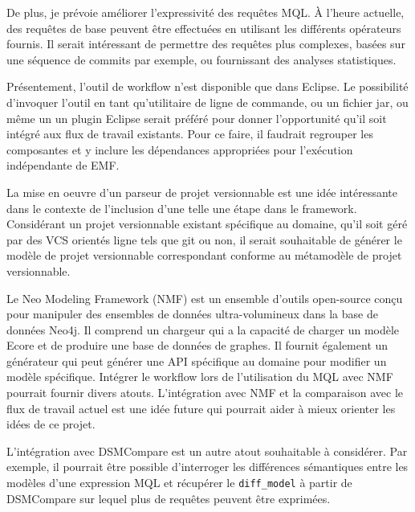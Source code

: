 \documentclass[12pt, titlepage]{article}
\begin{document}
De plus, je prévoie améliorer l'expressivité des requêtes MQL. À l'heure
actuelle, des requêtes de base peuvent être effectuées en utilisant les
différents opérateurs fournis. Il serait intéressant de permettre des requêtes
plus complexes, basées sur une séquence de commits par exemple, ou fournissant
des analyses statistiques.

Présentement, l'outil de workflow n'est disponible que dans Eclipse. Le
possibilité d'invoquer l'outil en tant qu'utilitaire de ligne de commande, ou un
fichier jar, ou même un un plugin Eclipse serait préféré pour donner
l'opportunité qu'il soit intégré aux flux de travail existants. Pour ce faire,
il faudrait regrouper les composantes et y inclure les dépendances appropriées
pour l'exécution indépendante de EMF.

La mise en oeuvre d'un parseur de projet versionnable est une idée intéressante
dans le contexte de l'inclusion d'une telle une étape dans le
framework. Considérant un projet versionnable existant spécifique au domaine,
qu'il soit géré par des VCS orientés ligne tels que git ou non, il serait
souhaitable de générer le modèle de projet versionnable correspondant conforme
au métamodèle de projet versionnable.

Le Neo Modeling Framework (NMF) \cite{nmf} est un ensemble d'outils open-source
conçu pour manipuler des ensembles de données ultra-volumineux dans la base de
données Neo4j. Il comprend un chargeur qui a la capacité de charger un modèle
Ecore et de produire une base de données de graphes. Il fournit également un
générateur qui peut générer une API spécifique au domaine pour modifier un
modèle spécifique. Intégrer le workflow lors de l'utilisation du MQL avec NMF
pourrait fournir divers atouts. L'intégration avec NMF et la comparaison avec le
flux de travail actuel est une idée future qui pourrait aider à mieux orienter
les idées de ce projet.

L'intégration avec DSMCompare \cite{dsmcompare} est un autre atout souhaitable à
considérer. Par exemple, il pourrait être possible d'interroger les différences
sémantiques entre les modèles d'une expression MQL et récupérer le
\texttt{diff\_model} à partir de DSMCompare sur lequel plus de requêtes peuvent
être exprimées.

 

\end{document}
